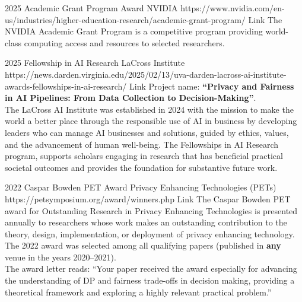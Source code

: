 \documentclass[localFont,alternative]{documentMETADATA}
\begin{document}

\begin{awards}
	\awardentryD
	{2025}
	{Academic Grant Program Award}
	{NVIDIA}
	{https://www.nvidia.com/en-us/industries/higher-education-research/academic-grant-program/}
	{Link}
	{The NVIDIA Academic Grant Program is a competitive program providing world-class computing access and resources to selected researchers.}

	\awardentryD
	{2025}
	{Fellowship in AI Research}
	{LaCross Institute}%
	{https://news.darden.virginia.edu/2025/02/13/uva-darden-lacross-ai-institute-awards-fellowships-in-ai-research/}
	{Link}
	{Project name: \textbf{``Privacy and Fairness in AI Pipelines: From Data Collection to Decision-Making''}.\\
	The LaCross AI Institute was established in 2024 with the mission to make the 
	world a better place through the responsible use of AI in business by developing 
	leaders who can manage AI businesses and solutions, guided by ethics, values, and 
	the advancement of human well-being. 
	The Fellowships in AI Research program, supports scholars engaging in research that 
	has beneficial practical societal outcomes and provides the foundation for substantive future work.
	}

	\awardentryD
	{2022}
	{Caspar Bowden PET Award}%
	{Privacy Enhancing Technologies (PETs)}
	{https://petsymposium.org/award/winners.php}
	{Link}
	{The Caspar Bowden PET award for Outstanding Research in Privacy Enhancing Technologies is presented annually to researchers 
	whose work makes an outstanding contribution to the theory, design, implementation, or deployment of privacy enhancing technology. The 2022 award was selected among all qualifying papers (published in \textbf{any} venue in the years 2020--2021).\\
	The award letter reads: ``Your paper  received the award especially for advancing the understanding of DP and fairness trade-offs in decision making, providing a theoretical framework and exploring a highly relevant practical problem.''}


\end{awards}
\end{document}
